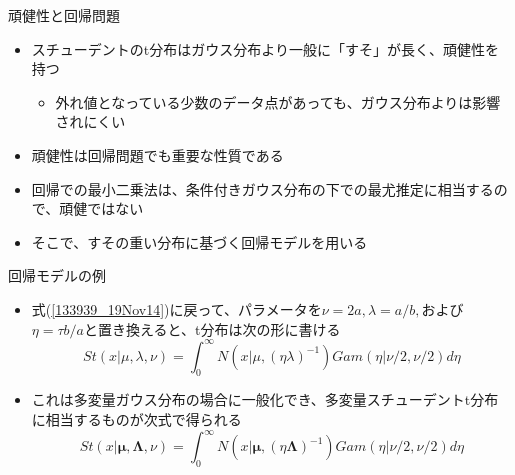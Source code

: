 \begin{frame}{頑健性と回帰問題}
 \begin{itemize}
  \item スチューデントのt分布はガウス分布より一般に「すそ」が長く、\alert{頑健性}を持つ
        \begin{itemize}
         \item 外れ値となっている少数のデータ点があっても、ガウス分布よりは影響されにくい
        \end{itemize}
  \item 頑健性は回帰問題でも重要な性質である
  \item 回帰での最小二乗法は、条件付きガウス分布の下での最尤推定に相当するので、頑健ではない
  \item そこで、すその重い分布に基づく回帰モデルを用いる
 \end{itemize}
\end{frame}

\begin{frame}{回帰モデルの例}
 \begin{itemize}
  \item 式(\ref{133939_19Nov14})に戻って、パラメータを$\nu=2a,\lambda=a/b,$および$\eta=\tau b/a$と置き換えると、t分布は次の形に書ける
        \begin{equation}
         St(x|\mu,\lambda,\nu) = \int_{0}^{\infty}N(x|\mu, (\eta\lambda)^{-1})Gam(\eta|\nu/2,\nu/2)d\eta
        \end{equation}
  \item これは多変量ガウス分布の場合に一般化でき、多変量スチューデントt分布に相当するものが次式で得られる
        \begin{equation}
         St(x|\bm{\mu},\bm{\Lambda},\nu) = \int_{0}^{\infty}N(x|\bm{\mu}, (\eta\bm{\Lambda})^{-1})Gam(\eta|\nu/2,\nu/2)d\eta
        \end{equation}
 \end{itemize}
\end{frame}

